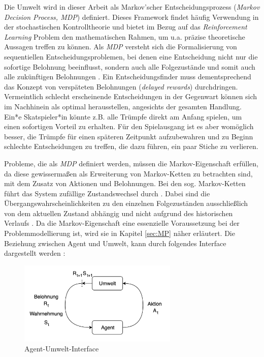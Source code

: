 Die Umwelt wird in dieser Arbeit als Markov'scher Entscheidungsprozess (\textit{Markov Decision Process, MDP}) definiert. Dieses Framework findet häufig Verwendung in der stochastischen Kontrolltheorie \cite[S.~3]{Gosavi} und bietet im Bezug auf das \textit{Reinforcement Learning} Problem den mathematischen Rahmen, um u.a. präzise theoretische Aussagen treffen zu können. Als \textit{MDP} versteht sich die Formalisierung von sequentiellen Entscheidungsproblemen, bei denen eine Entscheidung nicht nur die sofortige Belohnung beeinflusst, sondern auch alle Folgezustände und somit auch alle zukünftigen Belohnungen \cite[S.~47]{Sutton1998}. Ein Entscheidungsfinder muss dementsprechend das Konzept von verspäteten Belohnungen (\textit{delayed rewards}) durchdringen. Vermeintlich schlecht erscheinende Entscheidungen in der Gegenwart können sich im Nachhinein als optimal herausstellen, angesichts der gesamten Handlung. Ein*e Skatspieler*in könnte z.B. alle Trümpfe direkt am Anfang spielen, um einen sofortigen Vorteil zu erhalten. Für den Spielausgang ist es aber womöglich besser, die Trümpfe für einen späteren Zeitpunkt aufzubewahren und zu Beginn \glqq schlechte \grqq{} Entscheidungen zu treffen, die dazu führen, ein paar Stiche zu verlieren.
\par 
Probleme, die als \textit{MDP} definiert werden, müssen die Markov-Eigenschaft erfüllen, da diese gewissermaßen als Erweiterung von Markov-Ketten zu betrachten sind, mit dem Zusatz von Aktionen und Belohnungen. Bei den sog. Markov-Ketten führt das System zufällige Zustandswechsel durch \cite[S.~3]{Gosavi}. Dabei sind die Übergangswahrscheinlichkeiten zu den einzelnen Folgezuständen ausschließlich von dem aktuellen Zustand abhängig und nicht aufgrund des historischen Verlaufs \cite[S.~3]{Gosavi}. Da die Markov-Eigenschaft eine essenzielle Voraussetzung bei der Problemmodellierung ist, wird sie in Kapitel \ref{sec:MP} näher erläutert. Die Beziehung zwischen Agent und Umwelt, kann durch folgendes Interface dargestellt werden \cite[S.~48]{Sutton1998}:

\par 

\begin{figure}[H]
    \centering
    \includegraphics[height=150px]{images/agentUmweltInterface.png}
    \caption{Agent-Umwelt-Interface}
\end{figure}


